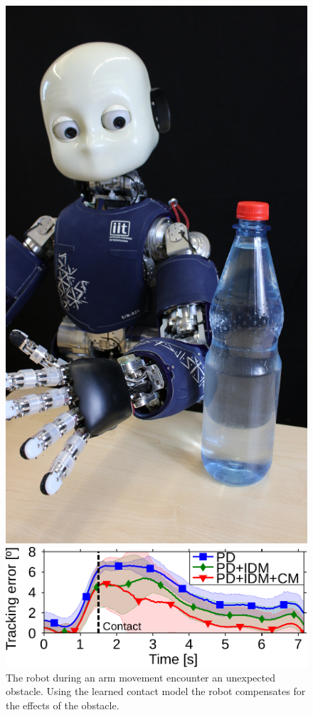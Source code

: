 	\begin{figure}[t]
		\begin{minipage}{.33\linewidth}
			\centering
			\includegraphics[width =.94\linewidth]{images/taskPush.jpg}
			\caption{The robot during an arm movement encounter an unexpected obstacle. Using the learned contact model the robot compensates for the effects of the obstacle.}
			\label{fig:exp3:icuparis_experiment_bars}
		\end{minipage}	
		\hfill
		\begin{minipage}{.62\linewidth}
			\centering
			\includegraphics[width=.89\linewidth]{images/trackErrContact3_mod}

\end{minipage}
\end{figure}
